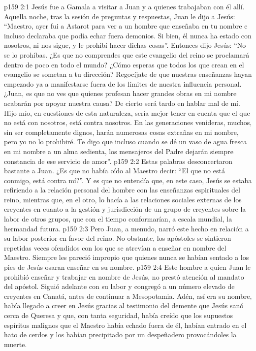 \vs p159 2:1 Jesús fue a Gamala a visitar a Juan y a quienes trabajaban con él allí. Aquella noche, tras la sesión de preguntas y respuestas, Juan le dijo a Jesús: “Maestro, ayer fui a Astarot para ver a un hombre que enseñaba en tu nombre e incluso declaraba que podía echar fuera demonios. Si bien, él nunca ha estado con nosotros, ni nos sigue, y le prohibí hacer dichas cosas”. Entonces dijo Jesús: “No se lo prohíbas. ¿Es que no comprendes que este evangelio del reino se proclamará dentro de poco en todo el mundo? ¿Cómo esperas que todos los que crean en el evangelio se sometan a tu dirección? Regocíjate de que nuestras enseñanzas hayan empezado ya a manifestarse fuera de los límites de nuestra influencia personal. ¿Juan, es que no ves que quienes profesan hacer grandes obras en mi nombre acabarán por apoyar nuestra causa? De cierto será tardo en hablar mal de mí. Hijo mío, en cuestiones de esta naturaleza, sería mejor tener en cuenta que el que no está con nosotros, está contra nosotros. En las generaciones venideras, muchos, sin ser completamente dignos, harán numerosas cosas extrañas en mi nombre, pero yo no lo prohibiré. Te digo que incluso cuando se dé un vaso de agua fresca en mi nombre a un alma sedienta, los mensajeros del Padre dejarán siempre constancia de ese servicio de amor”.
\vs p159 2:2 Estas palabras desconcertaron bastante a Juan. ¿Es que no había oído al Maestro decir: “El que no está conmigo, está contra mí?”. Y es que no entendía que, en este caso, Jesús se estaba refiriendo a la relación personal del hombre con las enseñanzas espirituales del reino, mientras que, en el otro, lo hacía a las relaciones sociales externas de los creyentes en cuanto a la gestión y jurisdicción de un grupo de creyentes sobre la labor de otros grupos, que con el tiempo conformarían, a escala mundial, la hermandad futura.
\vs p159 2:3 Pero Juan, a menudo, narró este hecho en relación a su labor posterior en favor del reino. No obstante, los apóstoles se sintieron repetidas veces ofendidos con los que se atrevían a enseñar en nombre del Maestro. Siempre les pareció impropio que quienes nunca se habían sentado a los pies de Jesús osaran enseñar en su nombre.
\vs p159 2:4 Este hombre a quien Juan le prohibió enseñar y trabajar en nombre de Jesús, no prestó atención al mandato del apóstol. Siguió adelante con su labor y congregó a un número elevado de creyentes en Canatá, antes de continuar a Mesopotamia. Adén, así era su nombre, había llegado a creer en Jesús gracias al testimonio del demente que Jesús sanó cerca de Queresa y que, con tanta seguridad, había creído que los supuestos espíritus malignos que el Maestro había echado fuera de él, habían entrado en el hato de cerdos y los habían precipitado por un despeñadero provocándoles la muerte.
